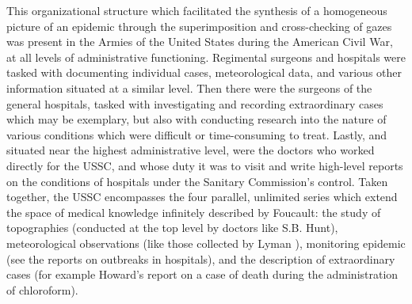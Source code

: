 \documentclass{report}
\begin{document}
  This organizational structure which facilitated the synthesis of a homogeneous picture of an epidemic through the superimposition and cross-checking 
  of gazes was present in the Armies of the United States during the American Civil War, at all levels of administrative functioning. Regimental
  surgeons and hospitals were tasked with documenting individual cases, meteorological data, and various other information situated at a similar
  level. Then there were the surgeons of the general hospitals, tasked with investigating and recording extraordinary cases which may be exemplary,
  but also with conducting research into the nature of various conditions which were difficult or time-consuming to treat. Lastly, and situated near
  the highest administrative level, were the doctors who worked directly for the USSC, and whose duty it was to visit and write high-level
  reports on the conditions of hospitals under the Sanitary Commission's control. Taken together, the USSC encompasses the four parallel,
  unlimited series which extend the space of medical knowledge infinitely described by Foucault\autocite[pp. 28]{Foucault1994}: the study of topographies 
  (conducted at the top level by doctors like S.B. Hunt\autocite{ussc:6:0990}), meteorological observations (like those collected by Lyman 
  \autocite{ussc:6:0112}), monitoring epidemic (see the reports on outbreaks in hospitals\autocite{ussc:9:1198}), and the description of extraordinary 
  cases (for example Howard's report on a case of death during the administration of chloroform\autocite{ussc:9:0388}).

  \newpage
  \nocite{*}
  \printbibliography
\end{document}
